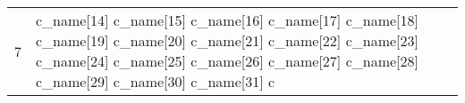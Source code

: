 \begin{longtable}{| p{0.5cm} | p{3cm} | p{8.5cm} | p{4cm} |}
7 & c\_name[14] \newline c\_name[15] \newline c\_name[16] \newline c\_name[17] \newline c\_name[18] \newline c\_name[19] \newline c\_name[20] \newline c\_name[21] \newline c\_name[22] \newline c\_name[23] \newline c\_name[24] \newline c\_name[25] \newline c\_name[26] \newline c\_name[27] c\_name[28] \newline  c\_name[29] \newline c\_name[30] \newline c\_name[31] \newline c
\end{longtable}
